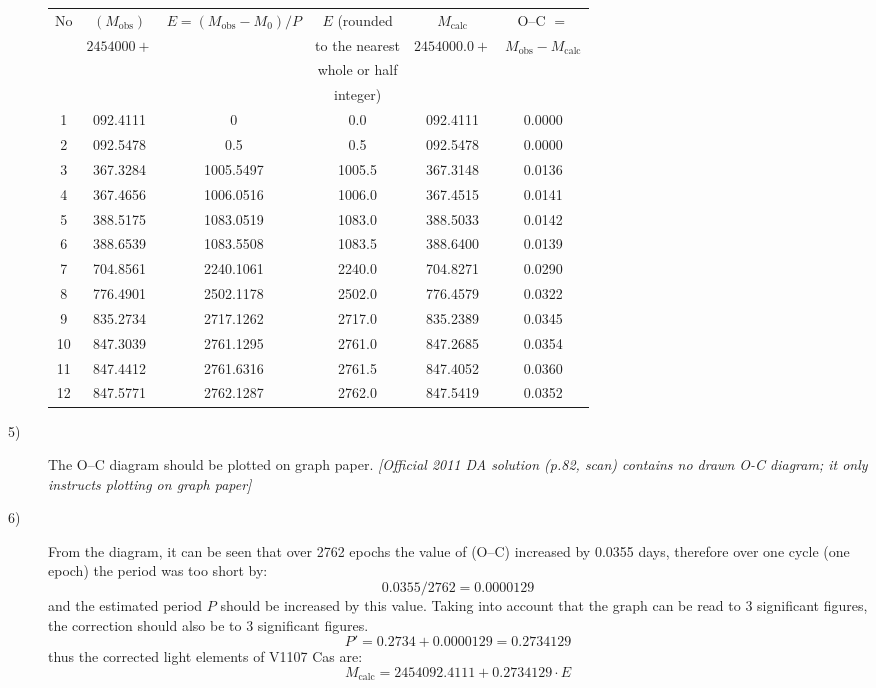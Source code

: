 \begin{description}
  \begin{center}
  \begin{tabular}{cccccc}
    \hline
    No & $(M_{\mathrm{obs}})$ & $E = (M_{\mathrm{obs}} - M_0)/P$
       & $E$ (rounded & $M_{\mathrm{calc}}$
       & O--C $=$ \\
       & $2454000+$ & & to the nearest & $2454000.0+$
       & $M_{\mathrm{obs}} - M_{\mathrm{calc}}$ \\
       & & & whole or half & & \\
       & & & integer) & & \\
    \hline
    1  & 092.4111 & 0         & 0.0    & 092.4111 & 0.0000 \\
    2  & 092.5478 & 0.5       & 0.5    & 092.5478 & 0.0000 \\
    3  & 367.3284 & 1005.5497 & 1005.5 & 367.3148 & 0.0136 \\
    4  & 367.4656 & 1006.0516 & 1006.0 & 367.4515 & 0.0141 \\
    5  & 388.5175 & 1083.0519 & 1083.0 & 388.5033 & 0.0142 \\
    6  & 388.6539 & 1083.5508 & 1083.5 & 388.6400 & 0.0139 \\
    7  & 704.8561 & 2240.1061 & 2240.0 & 704.8271 & 0.0290 \\
    8  & 776.4901 & 2502.1178 & 2502.0 & 776.4579 & 0.0322 \\
    9  & 835.2734 & 2717.1262 & 2717.0 & 835.2389 & 0.0345 \\
    10 & 847.3039 & 2761.1295 & 2761.0 & 847.2685 & 0.0354 \\
    11 & 847.4412 & 2761.6316 & 2761.5 & 847.4052 & 0.0360 \\
    12 & 847.5771 & 2762.1287 & 2762.0 & 847.5419 & 0.0352 \\
    \hline
  \end{tabular}
  \end{center}

\item[5)] The O--C diagram should be plotted on graph paper.
  \textit{[Official 2011 DA solution (p.82, scan) contains no drawn O-C diagram; it only instructs plotting on graph paper]}

\item[6)] From the diagram, it can be seen that over 2762 epochs the value of
  (O--C) increased by 0.0355 days, therefore over one cycle (one epoch) the
  period was too short by:
  \[ 0.0355/2762 = 0.0000129 \]
  and the estimated period $P$ should be increased by this value. Taking into
  account that the graph can be read to 3 significant figures, the correction
  should also be to 3 significant figures.
  \[ P' = 0.2734 + 0.0000129 = 0.2734129 \]
  thus the corrected light elements of V1107 Cas are:
  \[ M_{\mathrm{calc}} = 2454092.4111 + 0.2734129 \cdot E \]


\end{description}
